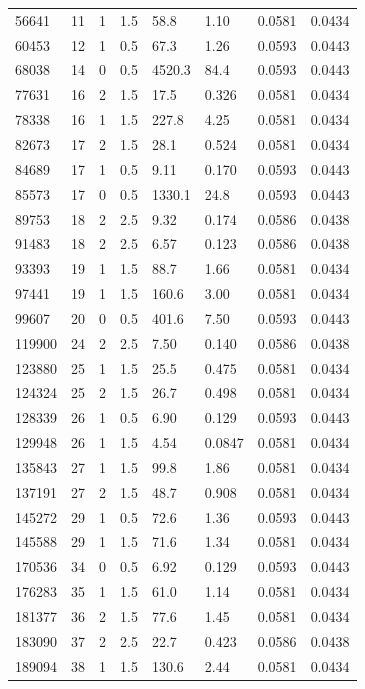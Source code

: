 \documentclass[preview]{standalone}
\begin{document}
{{\begin{tabular}{L{1.2cm}C{1.2cm} C{0.3cm}C{0.5cm} C{1.4cm}C{1.4cm} C{1.4cm}C{1.4cm}}
  56641  &    11  & 1     & 1.5 &  58.8  & 1.10  & 0.0581 &  0.0434   \\ 
  60453  &    12  & 1     & 0.5 &  67.3  & 1.26  & 0.0593 &  0.0443   \\ 
  68038  &    14  & 0     & 0.5 &  4520.3  & 84.4  & 0.0593 &  0.0443   \\ 
  77631  &    16  & 2     & 1.5 &  17.5  & 0.326  & 0.0581 &  0.0434   \\ 
  78338  &    16  & 1     & 1.5 &  227.8  & 4.25  & 0.0581 &  0.0434   \\ 
  82673  &    17  & 2     & 1.5 &  28.1  & 0.524  & 0.0581 &  0.0434   \\ 
  84689  &    17  & 1     & 0.5 &  9.11  & 0.170  & 0.0593 &  0.0443   \\ 
  85573  &    17  & 0     & 0.5 &  1330.1  & 24.8  & 0.0593 &  0.0443   \\ 
  89753  &    18  & 2     & 2.5 &  9.32  & 0.174  & 0.0586 &  0.0438   \\ 
  91483  &    18  & 2     & 2.5 &  6.57  & 0.123  & 0.0586 &  0.0438   \\ 
  93393  &    19  & 1     & 1.5 &  88.7  & 1.66  & 0.0581 &  0.0434   \\ 
  97441  &    19  & 1     & 1.5 &  160.6  & 3.00  & 0.0581 &  0.0434   \\ 
  99607  &    20  & 0     & 0.5 &  401.6  & 7.50  & 0.0593 &  0.0443   \\ 
  119900  &    24  & 2     & 2.5 &  7.50  & 0.140  & 0.0586 &  0.0438   \\ 
  123880  &    25  & 1     & 1.5 &  25.5  & 0.475  & 0.0581 &  0.0434   \\ 
  124324  &    25  & 2     & 1.5 &  26.7  & 0.498  & 0.0581 &  0.0434   \\ 
  128339  &    26  & 1     & 0.5 &  6.90  & 0.129  & 0.0593 &  0.0443   \\ 
  129948  &    26  & 1     & 1.5 &  4.54  & 0.0847  & 0.0581 &  0.0434   \\ 
  135843  &    27  & 1     & 1.5 &  99.8  & 1.86  & 0.0581 &  0.0434   \\ 
  137191  &    27  & 2     & 1.5 &  48.7  & 0.908  & 0.0581 &  0.0434   \\ 
  145272  &    29  & 1     & 0.5 &  72.6  & 1.36  & 0.0593 &  0.0443   \\ 
  145588  &    29  & 1     & 1.5 &  71.6  & 1.34  & 0.0581 &  0.0434   \\ 
  170536  &    34  & 0     & 0.5 &  6.92  & 0.129  & 0.0593 &  0.0443   \\ 
  176283  &    35  & 1     & 1.5 &  61.0  & 1.14  & 0.0581 &  0.0434   \\ 
  181377  &    36  & 2     & 1.5 &  77.6  & 1.45  & 0.0581 &  0.0434   \\ 
  183090  &    37  & 2     & 2.5 &  22.7  & 0.423  & 0.0586 &  0.0438   \\ 
  189094  &    38  & 1     & 1.5 &  130.6  & 2.44  & 0.0581 &  0.0434   \\ 
\hline 
\end{tabular} 

}}
\end{document}
